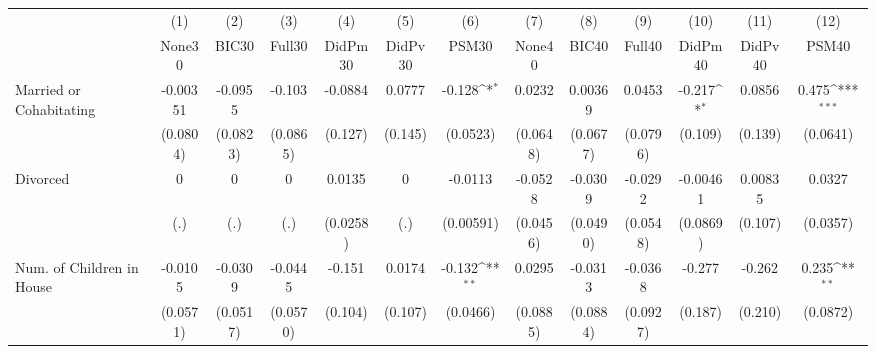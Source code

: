 {
\def\sym#1{\ifmmode^{#1}\else\(^{#1}\)\fi}
\begin{tabular}{l*{12}{c}}
\toprule
            &\multicolumn{1}{c}{(1)}&\multicolumn{1}{c}{(2)}&\multicolumn{1}{c}{(3)}&\multicolumn{1}{c}{(4)}&\multicolumn{1}{c}{(5)}&\multicolumn{1}{c}{(6)}&\multicolumn{1}{c}{(7)}&\multicolumn{1}{c}{(8)}&\multicolumn{1}{c}{(9)}&\multicolumn{1}{c}{(10)}&\multicolumn{1}{c}{(11)}&\multicolumn{1}{c}{(12)}\\
            &\multicolumn{1}{c}{None30}&\multicolumn{1}{c}{BIC30}&\multicolumn{1}{c}{Full30}&\multicolumn{1}{c}{DidPm30}&\multicolumn{1}{c}{DidPv30}&\multicolumn{1}{c}{PSM30}&\multicolumn{1}{c}{None40}&\multicolumn{1}{c}{BIC40}&\multicolumn{1}{c}{Full40}&\multicolumn{1}{c}{DidPm40}&\multicolumn{1}{c}{DidPv40}&\multicolumn{1}{c}{PSM40}\\
\midrule
Married or Cohabitating&    -0.00351         &     -0.0955         &      -0.103         &     -0.0884         &      0.0777         &      -0.128\sym{*}  &      0.0232         &     0.00369         &      0.0453         &      -0.217\sym{*}  &      0.0856         &       0.475\sym{***}\\
            &    (0.0804)         &    (0.0823)         &    (0.0865)         &     (0.127)         &     (0.145)         &    (0.0523)         &    (0.0648)         &    (0.0677)         &    (0.0796)         &     (0.109)         &     (0.139)         &    (0.0641)         \\
\addlinespace
Divorced    &           0         &           0         &           0         &      0.0135         &           0         &     -0.0113         &     -0.0528         &     -0.0309         &     -0.0292         &    -0.00461         &     0.00835         &      0.0327         \\
            &         (.)         &         (.)         &         (.)         &    (0.0258)         &         (.)         &   (0.00591)         &    (0.0456)         &    (0.0490)         &    (0.0548)         &    (0.0869)         &     (0.107)         &    (0.0357)         \\
\addlinespace
Num. of Children in House&     -0.0105         &     -0.0309         &     -0.0445         &      -0.151         &      0.0174         &      -0.132\sym{**} &      0.0295         &     -0.0313         &     -0.0368         &      -0.277         &      -0.262         &       0.235\sym{**} \\
            &    (0.0571)         &    (0.0517)         &    (0.0570)         &     (0.104)         &     (0.107)         &    (0.0466)         &    (0.0885)         &    (0.0884)         &    (0.0927)         &     (0.187)         &     (0.210)         &    (0.0872)         \\

\end{tabular}}
